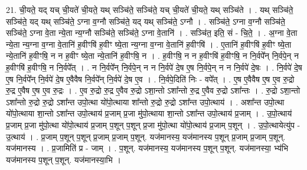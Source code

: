 \documentclass[17pt]{extarticle}
\begin{document}
21. ची॒यते॒ यद् यच् ची॒यते॑ ची॒यते॒ यथ् सञ्चि॑ते॒ सञ्चि॑ते॒ यच् ची॒यते॑ ची॒यते॒ यथ् सञ्चि॑ते । . यथ् सञ्चि॑ते॒ सञ्चि॑ते॒ यद् यथ् सञ्चि॑ते॒ ऽग्ना व॒ग्नौ सञ्चि॑ते॒ यद् यथ् सञ्चि॑ते॒ ऽग्नौ । . सञ्चि॑ते॒ ऽग्ना व॒ग्नौ सञ्चि॑ते॒ सञ्चि॑ते॒ ऽग्ना वे॒ता न्ये॒ता न्य॒ग्नौ सञ्चि॑ते॒ सञ्चि॑ते॒ ऽग्ना वे॒तानि॑ । . सञ्चि॑त॒ इति॒ सं - चि॒ते॒ । . अ॒ग्ना वे॒ता न्ये॒ता न्य॒ग्ना व॒ग्ना वे॒तानि॑ ह॒वीꣳषि॑ ह॒वीꣳ ष्ये॒ता न्य॒ग्ना व॒ग्ना वे॒तानि॑ ह॒वीꣳषि॑ । . ए॒तानि॑ ह॒वीꣳषि॑ ह॒वीꣳ ष्ये॒ता न्ये॒तानि॑ ह॒वीꣳषि॒ न न ह॒वीꣳ ष्ये॒ता न्ये॒तानि॑ ह॒वीꣳषि॒ न । . ह॒वीꣳषि॒ न न ह॒वीꣳषि॑ ह॒वीꣳषि॒ न नि॒र्वपे᳚न् नि॒र्वपे॒न् न ह॒वीꣳषि॑ ह॒वीꣳषि॒ न नि॒र्वपे᳚त् । . न नि॒र्वपे᳚न् नि॒र्वपे॒न् न न नि॒र्वपे॑ दे॒ष ए॒ष नि॒र्वपे॒न् न न नि॒र्वपे॑ दे॒षः । . नि॒र्वपे॑ दे॒ष ए॒ष नि॒र्वपे᳚न् नि॒र्वपे॑ दे॒ष ए॒वैवैष नि॒र्वपे᳚न् नि॒र्वपे॑ दे॒ष ए॒व । . नि॒र्वपे॒दिति॑ निः - वपे᳚त् । . ए॒ष ए॒वैवैष ए॒ष ए॒व रु॒द्रो रु॒द्र ए॒वैष ए॒ष ए॒व रु॒द्रः । . ए॒व रु॒द्रो रु॒द्र ए॒वैव रु॒द्रो ऽशा॒न्तो ऽशा᳚न्तो रु॒द्र ए॒वैव रु॒द्रो ऽशा᳚न्तः । . रु॒द्रो ऽशा॒न्तो ऽशा᳚न्तो रु॒द्रो रु॒द्रो ऽशा᳚न्त उपो॒त्था यो॑पो॒त्थाया शा᳚न्तो रु॒द्रो रु॒द्रो ऽशा᳚न्त उपो॒त्थाय॑ । . अशा᳚न्त उपो॒त्था यो॑पो॒त्थाया शा॒न्तो ऽशा᳚न्त उपो॒त्थाय॑ प्र॒जाम् प्र॒जा मु॑पो॒त्थाया शा॒न्तो ऽशा᳚न्त उपो॒त्थाय॑ प्र॒जाम् । . उ॒पो॒त्थाय॑ प्र॒जाम् प्र॒जा मु॑पो॒त्था यो॑पो॒त्थाय॑ प्र॒जाम् प॒शून् प॒शून् प्र॒जा मु॑पो॒त्था यो॑पो॒त्थाय॑ प्र॒जाम् प॒शून् । . उ॒पो॒त्थायेत्यु॑प - उ॒त्थाय॑ । . प्र॒जाम् प॒शून् प॒शून् प्र॒जाम् प्र॒जाम् प॒शून्. यज॑मानस्य॒ यज॑मानस्य प॒शून् प्र॒जाम् प्र॒जाम् प॒शून्. यज॑मानस्य । . प्र॒जामिति॑ प्र - जाम् । . प॒शून्. यज॑मानस्य॒ यज॑मानस्य प॒शून् प॒शून्. यज॑मानस्या॒ भ्य॑भि यज॑मानस्य प॒शून् प॒शून्. 
यज॑मानस्या॒भि । \newline
\end{document}
